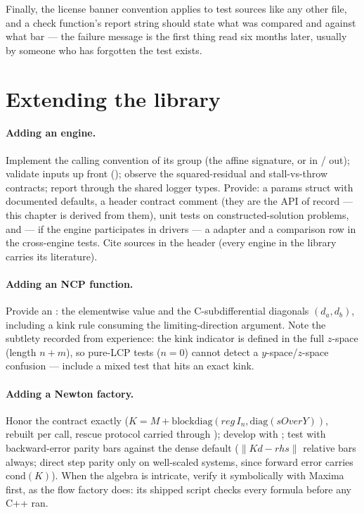 Finally, the license banner convention applies to test sources like any
other file, and a check function's report string should state what was
compared and against what bar --- the failure message is the first thing
read six months later, usually by someone who has forgotten the test
exists.

\section{Extending the library}
\label{sec:extending}

\paragraph{Adding an engine.} Implement the calling convention of its group
(the affine signature, or  in /  out); validate
inputs up front (); observe the
squared-residual and stall-vs-throw contracts; report through the shared
logger types. Provide: a params struct with documented defaults, a header
contract comment (they are the API of record --- this chapter is derived
from them), unit tests on constructed-solution problems, and --- if the
engine participates in drivers --- a  adapter and a
comparison row in the cross-engine tests. Cite sources in the header
(every engine in the library carries its literature).

\paragraph{Adding an NCP function.} Provide an : the
elementwise value and the C-subdifferential diagonals $(d_a, d_b)$,
including a kink rule consuming the limiting-direction argument. Note the
subtlety recorded from experience: the kink indicator is defined in the full
$z$-space (length $n+m$), so pure-LCP tests ($n = 0$) cannot detect a
$y$-space/$z$-space confusion --- include a mixed test that hits an exact
kink.

\paragraph{Adding a Newton factory.} Honor the 
contract exactly ($K = M + \mathrm{blockdiag}(\mathit{reg}\, I_n,
\mathrm{diag}(\mathit{sOverY}))$, rebuilt per call, rescue protocol carried
through ); develop with ;
test with backward-error parity bars against the dense default
($\|Kd - \mathit{rhs}\|$ relative bars always; direct step parity only on
well-scaled systems, since forward error carries $\mathrm{cond}(K)$). When
the algebra is intricate, verify it symbolically with Maxima
\cite{maxima} first, as the flow factory does: its shipped script checks
every formula before any C++ ran.

